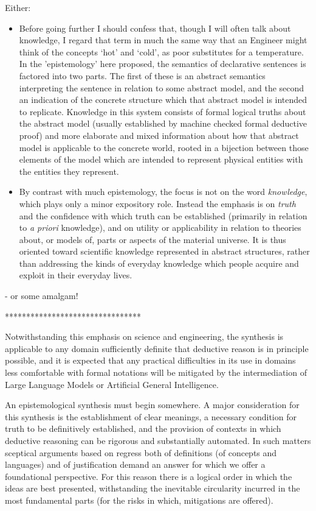 \documentclass[10pt,titlepage]{book}
\begin{document}
Either:
\begin{itemize}
  \item
Before going further I should confess that, though I will often talk about knowledge, I regard that term in much the same way that an Engineer might think of the concepts `hot' and `cold', as poor substitutes for a temperature.
In the 'epistemology' here proposed, the semantics of declarative sentences is factored into two parts.
The first of these is an abstract semantics interpreting the sentence in relation to some abstract model, and the second an indication of the concrete structure which that abstract model is intended to replicate.
Knowledge in this system consists of formal logical truths about the abstract model (usually established by machine checked formal deductive proof) and more elaborate and mixed information about how that abstract model is applicable to the concrete world, rooted in a bijection between those elements of the model which are intended to represent physical entities with the entities they represent.
\item
By contrast with much epistemology, the focus is not on the word \emph{knowledge}, which plays only a minor expository role.
Instead the emphasis is on \emph{truth} and the confidence with which truth can be established (primarily in relation to \emph{a priori} knowledge), and on utility or applicability in relation to theories about, or models of, parts or aspects of the material universe.
It is thus oriented toward scientific knowledge represented in abstract structures, rather than addressing the kinds of everyday knowledge which people acquire and exploit in their everyday lives.
\end{itemize}
- or some amalgam!


********************************

Notwithstanding this emphasis on science and engineering, the synthesis is applicable to any domain sufficiently definite that deductive reason is in principle possible, and it is expected that any practical difficulties in its use in domains less comfortable with formal notations will be mitigated by the intermediation of Large Language Models or Artificial General Intelligence.

An epistemological synthesis must begin somewhere.
A major consideration for this synthesis is the establishment of clear meanings, a necessary condition for truth to be definitively established, and the provision of contexts in which deductive reasoning can be rigorous and substantially automated.
In such matters sceptical arguments based on regress both of definitions (of concepts and languages) and of justification demand an answer for which we offer a foundational perspective.
For this reason there is a logical order in which the ideas are best presented, withstanding the inevitable circularity incurred in the most fundamental parts (for the risks in which, mitigations are offered).
\end{document}
